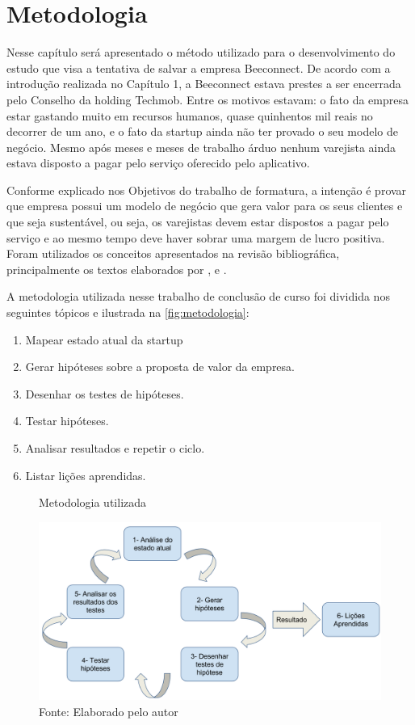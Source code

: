 \chapter[Metodologia]{Metodologia}
\label{chap:metodologia}
Nesse capítulo será apresentado o método utilizado para o desenvolvimento do estudo que visa a tentativa de salvar a empresa Beeconnect. De acordo com a introdução realizada no Capítulo 1, a Beeconnect estava prestes a ser encerrada pelo Conselho da holding Techmob. Entre os motivos estavam: o fato da empresa estar gastando muito em recursos humanos, quase quinhentos mil reais no decorrer de um ano, e o fato da startup ainda não ter provado o seu modelo de negócio. Mesmo após meses e meses de trabalho árduo nenhum varejista ainda estava disposto a pagar pelo serviço oferecido pelo aplicativo.

Conforme explicado nos Objetivos do trabalho de formatura, a intenção é provar que empresa possui um modelo de negócio que gera valor para os seus clientes e que seja sustentável, ou seja, os varejistas devem estar dispostos a pagar pelo serviço e ao mesmo tempo deve haver sobrar uma margem de lucro positiva. Foram utilizados os conceitos apresentados na revisão bibliográfica, principalmente os textos elaborados por ,  e .

A metodologia utilizada nesse trabalho de conclusão de curso foi dividida nos seguintes tópicos e ilustrada na \autoref{fig:metodologia}:
\begin{enumerate}
\item Mapear estado atual da startup
\item Gerar hipóteses sobre a proposta de valor da empresa.
\item Desenhar os testes de hipóteses.
\item Testar hipóteses.
\item Analisar resultados e repetir o ciclo.
\item Listar lições aprendidas.
\end{enumerate}

\begin{figure}[H]
\caption{Metodologia utilizada}
\centerline{\includegraphics[scale=0.25]{img/metodologia}}
\label{fig:metodologia}
\caption* {Fonte: Elaborado pelo autor}
\end{figure}

